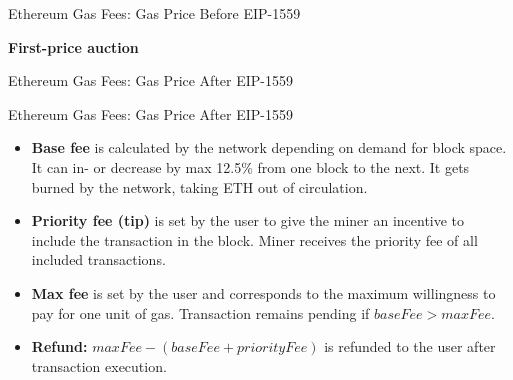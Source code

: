 \documentclass[]{beamer}
\begin{document}
\begin{frame}{Ethereum Gas Fees: Gas Price Before EIP-1559}
	\begin{center}
		\begin{tikzpicture}
			
		\end{tikzpicture}
	\end{center}
	
	\textbf{First-price auction}
	\begin{itemize}
	\end{itemize}
\end{frame}

\begin{frame}{Ethereum Gas Fees: Gas Price After EIP-1559}
	\begin{center}
		\begin{tikzpicture}
			
		\end{tikzpicture}
	\end{center}	
\end{frame}

\begin{frame}{Ethereum Gas Fees: Gas Price After EIP-1559}
	\begin{itemize}
		\item \textbf{Base fee} is calculated by the network depending on demand for block space. It can in- or decrease by max 12.5\% from one block to the next. It gets burned by the network, taking ETH out of circulation.
		\item \textbf{Priority fee (tip)} is set by the user to give the miner an incentive to include the transaction in the block. Miner receives the priority fee of all included transactions.
		\item \textbf{Max fee} is set by the user and corresponds to the maximum willingness to pay for one unit of gas. Transaction remains pending if $baseFee > maxFee$.
		\item \textbf{Refund:} $maxFee - (baseFee + priorityFee)$ is refunded to the user after transaction execution. 
	\end{itemize}	
\end{frame}
\end{document}
